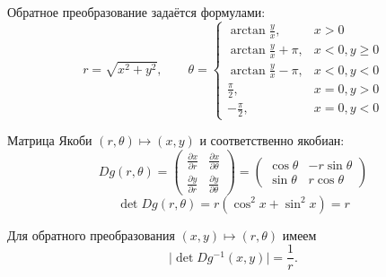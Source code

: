 \documentclass[a4paper,14pt]{extarticle}
\begin{document}
            Обратное преобразование задаётся формулами:
            \[
                r = \sqrt{x^2 + y^2},
                \qquad
                \theta = \begin{cases}
                             \arctan\frac{y}{x}, & x > 0 \\
                             \arctan\frac{y}{x} + \pi, & x < 0, y \ge 0 \\
                             \arctan\frac{y}{x} - \pi, & x < 0, y < 0 \\
                             \frac{\pi}{2}, & x = 0, y > 0 \\
                             -\frac{\pi}{2}, & x = 0, y < 0
                \end{cases}
            \]
            
            Матрица Якоби $(r,\theta) \mapsto (x,y)$ и соответственно якобиан:
            \[
                Dg(r,\theta) =
                \begin{pmatrix}
                    \frac{\partial x}{\partial r} & \frac{\partial x}{\partial \theta} \\
                    \frac{\partial y}{\partial r} & \frac{\partial y}{\partial \theta}
                \end{pmatrix} =
                \begin{pmatrix}
                    \cos \theta & -r \sin \theta \\
                    \sin \theta & r \cos \theta
                \end{pmatrix}
            \]
            \[
                \det Dg(r,\theta) = r(\cos^2 x + \sin^2 x) = r
            \]
            
            Для обратного преобразования $(x,y) \mapsto (r,\theta)$ имеем
            \[
                \big|\det Dg^{-1}(x,y)\big| = \frac{1}{r}.
            \]
            
\end{document}
